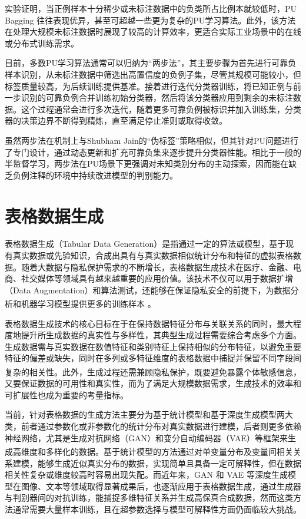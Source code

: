 实验证明，当正例样本十分稀少或未标注数据中的负类所占比例本就较低时，PU Bagging 往往表现优异，甚至可超越一些更为复杂的PU学习算法。此外，该方法在处理大规模未标注数据时展现了较高的计算效率，更适合实际工业场景中的在线或分布式训练需求。

目前，多数PU学习算法通常可以归纳为“两步法”，其主要步骤为首先进行可靠负样本识别，从未标注数据中筛选出高置信度的负例子集，尽管其规模可能较小，但标签质量较高，为后续训练提供基准。接着进行迭代分类器训练，将已知正例与前一步识别的可靠负例合并训练初始分类器，然后将该分类器应用到剩余的未标注数据。这个过程通常会进行多次迭代，随着更多可靠负例被标识并加入训练集，分类器的决策边界不断得到精炼，直至满足停止准则或取得收敛。

虽然两步法在机制上与Shubham Jain的“伪标签”策略相似，但其针对PU问题进行了专门设计，通过动态更新和扩充可靠负集来逐步提升分类器性能。相比于一般的半监督学习，两步法在PU场景下更强调对未知类别分布的主动探索，因而能在缺乏负例注释的环境中持续改进模型的判别能力。

\section{表格数据生成}


表格数据生成（Tabular Data Generation）是指通过一定的算法或模型，基于现有真实数据或先验知识，合成出具有与真实数据相似统计分布和特征的虚拟表格数据。随着大数据与隐私保护需求的不断增长，表格数据生成技术在医疗、金融、电商、社交媒体等领域具有越来越重要的应用价值。该技术不仅可以用于数据扩增（Data Augmentation）和算法测试，还能够在保证隐私安全的前提下，为数据分析和机器学习模型提供更多的训练样本 \textsuperscript{\cite{li2021survey}}。

表格数据生成技术的核心目标在于在保持数据特征分布与关联关系的同时，最大程度地提升所生成数据的真实性与多样性，其典型生成过程需要综合考虑多个方面。生成数据需与真实数据在数值特征和类别特征上保持相似的分布特征，以避免重要特征的偏差或缺失，同时在多列或多特征维度的表格数据中捕捉并保留不同字段间复杂的相关性\textsuperscript{\cite{zhang2020tab}}。此外，生成过程还需兼顾隐私保护，既要避免暴露个体敏感信息，又要保证数据的可用性和真实性，而为了满足大规模数据需求，生成技术的效率和可扩展性也成为重要的考量指标。


当前，针对表格数据的生成方法主要分为基于统计模型和基于深度生成模型两大类，前者通过参数化或非参数化的统计分布对真实数据进行建模，后者则更多依赖神经网络，尤其是生成对抗网络（GAN）和变分自动编码器（VAE）等框架来生成高维度和多样化的数据\textsuperscript{\cite{brown2019differential}}。基于统计模型的方法通过对单变量分布及变量间相关关系建模，能够生成近似真实分布的数据，实现简单且具备一定可解释性，但在数据相关性复杂或维度较高时容易出现失配。而近年来，GAN 和 VAE 等深度生成模型在图像、文本等领域取得显著成果后，也逐渐应用于表格数据生成，通过生成器与判别器间的对抗训练，能捕捉多维特征关系并生成高保真合成数据，然而这类方法通常需要大量样本训练，且在超参数选择与模型可解释性方面仍面临较大挑战。




